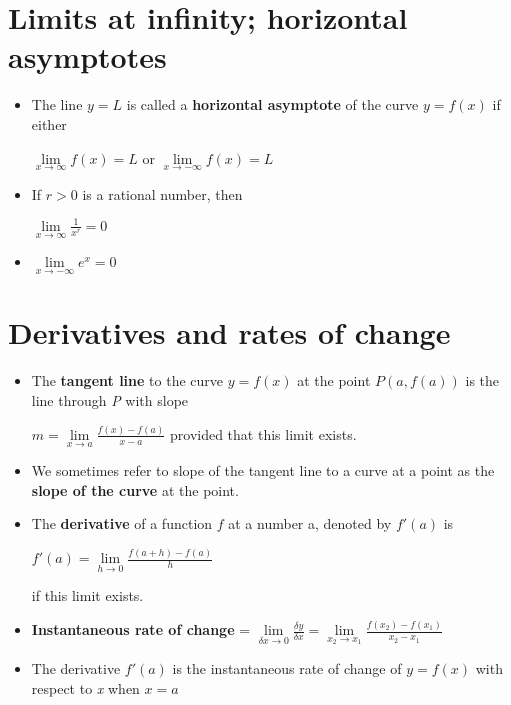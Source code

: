\documentclass{report}
\begin{document}
		\section{Limits at infinity; horizontal asymptotes}
			\begin{itemize}\addtolength{\leftskip}{2em}
				\item The line $y=L$ is called a \textbf{horizontal asymptote} of the curve $y=f(x)$ if either
				\begin{center}
					$\lim\limits_{x\rightarrow \infty}f(x)=L$ or $\lim\limits_{x\rightarrow -\infty}f(x)=L$
				\end{center}
				\item If $r>0$ is a rational number, then
					\begin{center}
					$\lim\limits_{x\rightarrow \infty}\frac{1}{x^r}=0$
					\end{center}
				\item $\lim\limits_{x\rightarrow -\infty}e^x=0$
			\end{itemize}
		\section{Derivatives and rates of change}
			\begin{itemize}\addtolength{\leftskip}{2em}
				\item The \textbf{tangent line} to the curve $y=f(x)$ at the point $P(a,f(a))$ is the line through \textit{P} with slope
				\begin{center}
				$m=\lim\limits_{x\rightarrow a}\frac{f(x)-f(a)}{x-a}$
				provided that this limit exists.
				\end{center}
				\item We sometimes refer to slope of the tangent line to a curve at a point as the \textbf{slope of the curve} at the point.
				\item The \textbf{derivative} of a function $f$ at a number a, denoted by $f'(a)$ is 
				\begin{center}
				$f'(a)=\lim\limits_{h\rightarrow 0}\frac{f(a+h)-f(a)}{h}$
				\end{center}
				if  this limit exists.
				\item \textbf{Instantaneous rate of change} = $\lim\limits_{\delta x \rightarrow 0}\frac{\delta y}{\delta x} = \lim\limits_{x_2 \rightarrow x_1} \frac{f(x_2)-f(x_1)}{x_2-x_1}$
				\item The derivative $f'(a)$ is the instantaneous rate of change of $y=f(x)$ with respect to \textit{x} when $x=a$
				
			\end{itemize}
\end{document}
